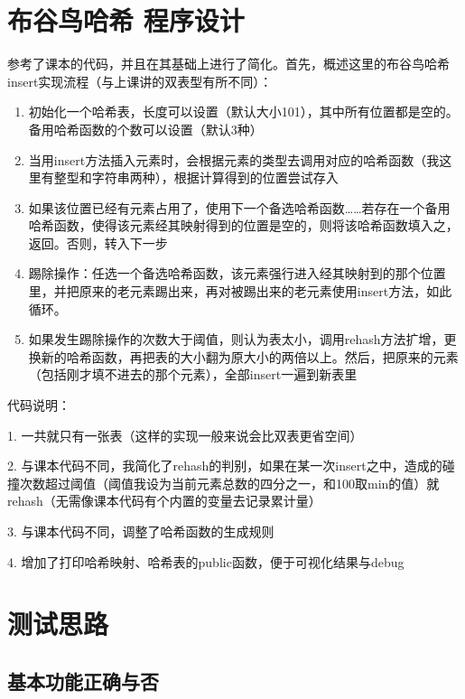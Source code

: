 \documentclass[UTF8]{ctexart}
\begin{document}
\pagestyle{fancy}
\fancyhead{}

\section{布谷鸟哈希 程序设计}

参考了课本的代码，并且在其基础上进行了简化。首先，概述这里的布谷鸟哈希insert实现流程（与上课讲的双表型有所不同）：

\begin{enumerate}

  \item 初始化一个哈希表，长度可以设置（默认大小101），其中所有位置都是空的。备用哈希函数的个数可以设置（默认3种）
  \item 当用insert方法插入元素时，会根据元素的类型去调用对应的哈希函数（我这里有整型和字符串两种），根据计算得到的位置尝试存入
  \item 如果该位置已经有元素占用了，使用下一个备选哈希函数……若存在一个备用哈希函数，使得该元素经其映射得到的位置是空的，则将该哈希函数填入之，返回。否则，转入下一步
  \item 踢除操作：任选一个备选哈希函数，该元素强行进入经其映射到的那个位置里，并把原来的老元素踢出来，再对被踢出来的老元素使用insert方法，如此循环。
  \item 如果发生踢除操作的次数大于阈值，则认为表太小，调用rehash方法扩增，更换新的哈希函数，再把表的大小翻为原大小的两倍以上。然后，把原来的元素（包括刚才填不进去的那个元素），全部insert一遍到新表里

\end{enumerate}

代码说明：

1. 一共就只有一张表（这样的实现一般来说会比双表更省空间）

2. 与课本代码不同，我简化了rehash的判别，如果在某一次insert之中，造成的碰撞次数超过阈值（阈值我设为当前元素总数的四分之一，和100取min的值）就rehash（无需像课本代码有个内置的变量去记录累计量）

3. 与课本代码不同，调整了哈希函数的生成规则

4. 增加了打印哈希映射、哈希表的public函数，便于可视化结果与debug

\section{测试思路}

\subsection{基本功能正确与否}
\end{document}
